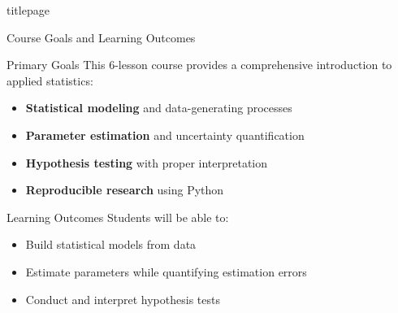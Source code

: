 \documentclass{beamer}
\newcommand{\robustcmd}[1]{\csname #1\endcsname}
\begin{document}
\begin{frame}
  \robustcmd{titlepage}
\end{frame}

\begin{frame}{Course Goals and Learning Outcomes}
  \begin{block}{Primary Goals}
    This 6-lesson course provides a comprehensive introduction to applied statistics:
    \begin{itemize}
      \item \textbf{Statistical modeling} and data-generating processes
      \item \textbf{Parameter estimation} and uncertainty quantification
      \item \textbf{Hypothesis testing} with proper interpretation
      \item \textbf{Reproducible research} using Python
    \end{itemize}
  \end{block}

  \begin{block}{Learning Outcomes}
    Students will be able to:
    \begin{itemize}
      \item Build statistical models from data
      \item Estimate parameters while quantifying estimation errors
      \item Conduct and interpret hypothesis tests
    \end{itemize}
  \end{block}
\end{frame}
\end{document}
